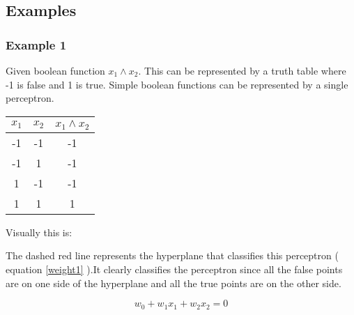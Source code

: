 \documentclass[10pt,a4paper]{article}
\begin{document}
\citep{Michell2009}
\subsection{Examples}
\subsubsection{Example 1}

Given boolean function $x_1 \wedge x_2$. This can be represented by a truth table where -1 is false and 1 is true. Simple boolean functions can be represented by a single perceptron.

\begin{tabular}{|c|c|c|}
\hline
$x_1$ & $x_2$ & $x_1\wedge x_2$ \\
\hline
-1 & -1 & -1 \\
-1 & 1 & -1 \\
1 & -1 & -1 \\
1 & 1 & 1 \\
\hline
\end{tabular}

Visually this is:

\begin{center}
\end{center}

The dashed red line represents the hyperplane that classifies this perceptron ( equation \ref{weight1} ).It clearly classifies the perceptron since all the false points are on one side of the hyperplane and all the true points are on the other side. 

\begin{equation}
\label{weight1}
w_0 + w_1x_1 + w_2x_2 = 0
\end{equation}
\end{document}
